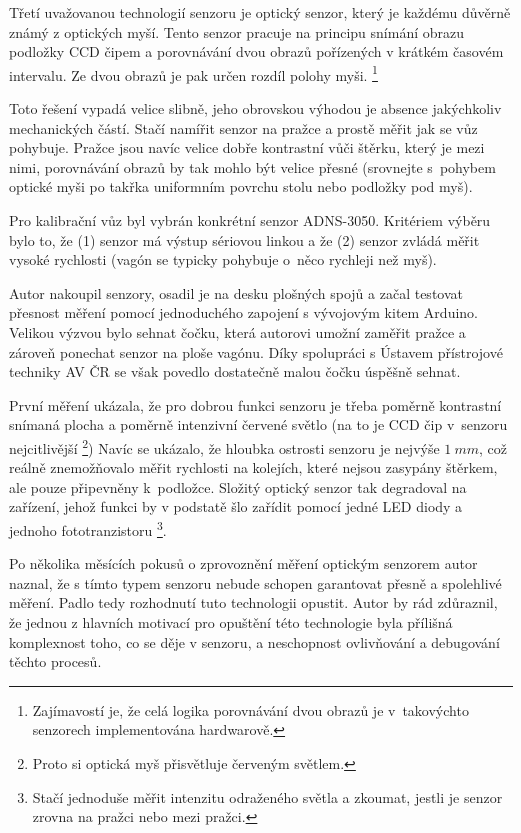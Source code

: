 Třetí uvažovanou technologií senzoru je optický senzor, který je každému
důvěrně známý z optických myší. Tento senzor pracuje na principu snímání obrazu
podložky CCD čipem a porovnávání dvou obrazů pořízených v krátkém časovém
intervalu. Ze dvou obrazů je pak určen rozdíl polohy myši.
\footnote{Zajímavostí je, že celá logika porovnávání dvou obrazů je
v~takovýchto senzorech implementována hardwarově.}

Toto řešení vypadá velice slibně, jeho obrovskou výhodou je absence jakýchkoliv
mechanických částí. Stačí namířit senzor na pražce a prostě měřit jak se vůz
pohybuje. Pražce jsou navíc velice dobře kontrastní vůči štěrku, který je mezi
nimi, porovnávání obrazů by tak mohlo být velice přesné (srovnejte s~pohybem
optické myši po takřka uniformním povrchu stolu nebo podložky pod myš).

Pro kalibrační vůz byl vybrán konkrétní senzor ADNS-3050. Kritériem výběru
bylo to, že (1) senzor má výstup sériovou linkou a že (2) senzor zvládá měřit
vysoké rychlosti (vagón se typicky pohybuje o~něco rychleji než myš).

Autor nakoupil senzory, osadil je na desku plošných spojů a začal testovat
přesnost měření pomocí jednoduchého zapojení s vývojovým kitem Arduino. Velikou
výzvou bylo sehnat čočku, která autorovi umožní zaměřit pražce a zároveň
ponechat senzor na ploše vagónu. Díky spolupráci s Ústavem přístrojové techniky
AV ČR se však povedlo dostatečně malou čočku úspěšně sehnat.

První měření ukázala, že pro dobrou funkci senzoru je třeba poměrně kontrastní
snímaná plocha a poměrně intenzivní červené světlo (na to je CCD čip v~senzoru
nejcitlivější \footnote{Proto si optická myš přisvětluje červeným světlem.})
Navíc se ukázalo, že hloubka ostrosti senzoru je nejvýše $1\ mm$, což reálně
znemožňovalo měřit rychlosti na kolejích, které nejsou zasypány štěrkem, ale
pouze připevněny k~podložce. Složitý optický senzor tak degradoval na zařízení,
jehož funkci by v podstatě šlo zařídit pomocí jedné LED diody a jednoho
fototranzistoru \footnote{Stačí jednoduše měřit intenzitu odraženého světla a
zkoumat, jestli je senzor zrovna na pražci nebo mezi pražci.}.

Po několika měsících pokusů o zprovoznění měření optickým senzorem autor naznal,
že s tímto typem senzoru nebude schopen garantovat přesně a spolehlivé měření.
Padlo tedy rozhodnutí tuto technologii opustit. Autor by rád zdůraznil, že
jednou z hlavních motivací pro opuštění této technologie byla přílišná
komplexnost toho, co se děje v senzoru, a neschopnost ovlivňování a debugování
těchto procesů.


